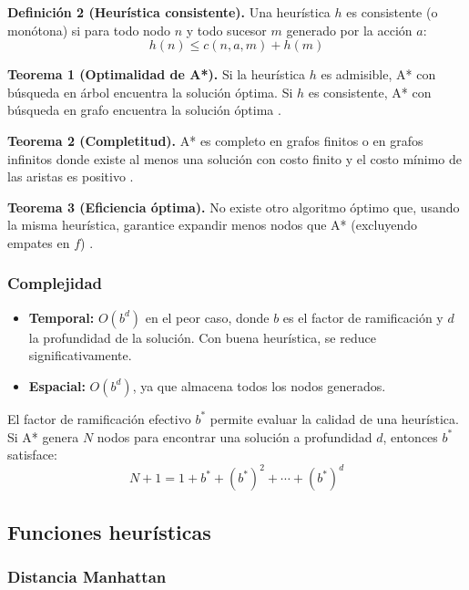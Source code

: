 \textbf{Definición 2 (Heurística consistente).} Una heurística $h$ es consistente (o monótona) si para todo nodo $n$ y todo sucesor $m$ generado por la acción $a$:
\begin{equation}
    h(n) \leq c(n, a, m) + h(m)
    \label{eq:consistent}
\end{equation}

\textbf{Teorema 1 (Optimalidad de A*).} Si la heurística $h$ es admisible, A* con búsqueda en árbol encuentra la solución óptima. Si $h$ es consistente, A* con búsqueda en grafo encuentra la solución óptima \cite{hart1968formal}.

\textbf{Teorema 2 (Completitud).} A* es completo en grafos finitos o en grafos infinitos donde existe al menos una solución con costo finito y el costo mínimo de las aristas es positivo \cite{pearl1984heuristics}.

\textbf{Teorema 3 (Eficiencia óptima).} No existe otro algoritmo óptimo que, usando la misma heurística, garantice expandir menos nodos que A* (excluyendo empates en $f$) \cite{dechter1985generalized}.

\subsubsection{Complejidad}

\begin{itemize}
    \item \textbf{Temporal:} $O(b^d)$ en el peor caso, donde $b$ es el factor de ramificación y $d$ la profundidad de la solución. Con buena heurística, se reduce significativamente.
    \item \textbf{Espacial:} $O(b^d)$, ya que almacena todos los nodos generados.
\end{itemize}

El factor de ramificación efectivo $b^*$ permite evaluar la calidad de una heurística. Si A* genera $N$ nodos para encontrar una solución a profundidad $d$, entonces $b^*$ satisface:
\begin{equation}
    N + 1 = 1 + b^* + (b^*)^2 + \cdots + (b^*)^d
    \label{eq:branching}
\end{equation}

\subsection{Funciones heurísticas}

\subsubsection{Distancia Manhattan}

